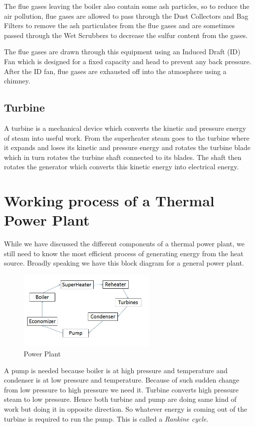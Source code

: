 \documentclass{report}
\begin{document}
The flue gases leaving the boiler also contain some ash particles, so to reduce the air pollution, flue gases are allowed to pass through the Dust Collectors and Bag Filters to remove the ash particulates from the flue gases and are sometimes passed through the Wet Scrubbers to decrease the sulfur content from the gases.

The flue gases are drawn through this equipment using an Induced Draft (ID) Fan which is designed for a fixed capacity and head to prevent any back pressure. After the ID fan, flue gases are exhausted off into the atmosphere using a chimney.

\subsection{Turbine}
A turbine is a mechanical device which converts the kinetic and pressure energy of steam into useful work. From the superheater steam goes to the turbine where it expands and loses its kinetic and pressure energy and rotates the turbine blade which in turn rotates the turbine shaft connected to its blades. The shaft then rotates the generator which converts this kinetic energy into electrical energy.

\section{Working process of a Thermal Power Plant}
While we have discussed the different components of a thermal power plant, we still need to know the most efficient process of generating energy from the heat source. Broadly speaking we have this block diagram for a general power plant.
\\
\begin{figure}[H]
\centering \includegraphics[width=0.6\textwidth]{captures/Capture1.JPG}
\caption{Power Plant}
\end{figure}
\par A pump is needed because boiler is at high pressure and temperature and condenser is at low pressure and temperature. Because of such sudden change from low pressure to high pressure we need it. Turbine converts high pressure steam to low pressure. Hence both turbine and pump are doing same kind of work but doing it in opposite direction. So whatever energy is coming out of the turbine is required to run the pump. This is called a {\it Rankine cycle}. 
\end{document}
